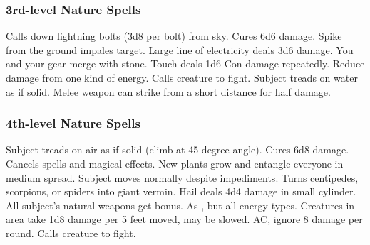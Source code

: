 \subsubsection{3rd-level Nature Spells}
\begin{spelllist}
   Calls down lightning bolts (3d8 per bolt) from sky.
   Cures 6d6 damage.
   Spike from the ground impales target.
   Large line of electricity deals 3d6 damage.
   You and your gear merge with stone.
   Touch deals 1d6 Con damage repeatedly.
   Reduce damage from one kind of energy.
   Calls creature to fight.
   Subject treads on water as if solid.
   Melee weapon can strike from a short distance for half damage.
\end{spelllist}

\subsubsection{4th-level Nature Spells}
\begin{spelllist}
   Subject treads on air as if solid (climb at 45-degree angle).
   Cures 6d8 damage.
   Cancels spells and magical effects.
   New plants grow and entangle everyone in medium spread.
   Subject moves normally despite impediments.
   Turns centipedes, scorpions, or spiders into giant vermin.
   Hail deals 4d4 damage in small cylinder.
   All subject's natural weapons get  bonus.
   As , but all energy types.
   Creatures in area take 1d8 damage per 5 feet moved, may be slowed.
    AC, ignore 8 damage per round.
   Calls creature to fight.
\end{spelllist}

